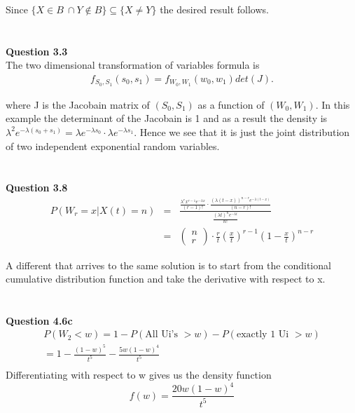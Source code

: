 \documentclass[10pt,a4paper]{article}
\begin{document}
\begin{flushleft}
Since $\{X \in B\ \cap Y \not \in B\} \subseteq  \{X \neq Y\}$ the
desired result follows.


\begin{eqnarray*}
\\
\end{eqnarray*}


\textbf{Question 3.3}\\
The two dimensional transformation of variables formula is
\begin{eqnarray*}
f_{S_0,S_1}(s_0,s_1)=f_{W_0,W_1}(w_0,w_1)det(J).
\end{eqnarray*}

where J is the Jacobain matrix of $(S_0,S_1)$ as a function of
$(W_0,W_1)$. In this example the determinant of the Jacobain is 1
and as a result the density is $\lambda^2 e^{-\lambda
(s_0+s_1)}=\lambda e^{-\lambda s_0} \cdot \lambda e^{-\lambda
s_1}$. Hence we see that it is just the joint distribution of two
independent exponential random variables.



\begin{eqnarray*}
\\
\end{eqnarray*}

\textbf{Question 3.8}\\

\begin{eqnarray*}
P(W_r=x|X(t)=n)&=& \frac{\frac{\lambda^r x^{r-1} e^{-\lambda
x}}{(r-1)!} \cdot \frac{(\lambda(t-x))^{n-r}
e^{-\lambda(t-x)}}{(n-r)!}}{ \frac{(\lambda t)^{n} e^{-\lambda
t}}{n!}}\\
&=& \left ( \begin{array}{c}
 n \\
 r
\end{array} \right) \cdot \frac{r}{t} (\frac{x}{t})^{r-1}
(1-\frac{x}{t})^{n-r}
\end{eqnarray*}

A different that arrives to the same solution is to start from the
conditional cumulative distribution function and take the
derivative with respect to x.


\begin{eqnarray*}
\\
\end{eqnarray*}

\textbf{Question 4.6c}\\
\begin{eqnarray*}
P(W_2<w)=1-P(\mbox{All Ui's } >w)-P(\mbox{exactly 1 Ui } > w)\\
=1 - \frac{(1-w)^5}{t^5} - \frac{5w(1-w)^4}{t^5}\\
\end{eqnarray*}
Differentiating with respect to w gives us the density function
\[f(w)=\frac{20w(1-w)^4}{t^5}\]



\end{flushleft}
\end{document}
